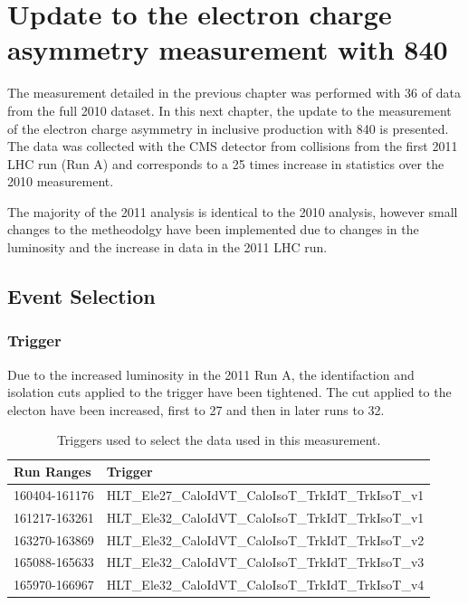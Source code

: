 \chapter[Electron Charge Asymmetry]{Update to the electron charge asymmetry
measurement with \unit{840}{\invpb} }

The measurement detailed in the previous chapter was performed with
\unit{36}{\invpb} of data from the full 2010 dataset. 
In this next chapter, the update to the measurement of the electron charge asymmetry in
inclusive \inclusiveWe production with \unit{840}{\invpb} is presented. 
The data was collected with the \ac{CMS} detector from collisions from the
first 2011 \ac{LHC} run (Run A) and corresponds to a 25 times increase in
statistics over the 2010 measurement.


The majority of the 2011 analysis is identical to the 2010 analysis,
however small changes to the metheodolgy have been implemented due to changes
in the luminosity and the increase in data in the 2011 \ac{LHC} run.

\section{Event Selection}

\subsection{Trigger}
Due to the increased luminosity in the 2011 Run A, the identifaction and
isolation cuts applied to the trigger have been tightened. The \PT cut applied
to the electon have been increased, first to \unit{27}{\GeV} and then in later
runs to \unit{32}{\GeV}.

\begin{table}[htbp]
  \begin{center}
    \leavevmode
     \begin{tabular}{ll} 
      Run Ranges & Trigger  \\
     \hline
     160404-161176 & HLT\_Ele27\_CaloIdVT\_CaloIsoT\_TrkIdT\_TrkIsoT\_v1  \\
     161217-163261 & HLT\_Ele32\_CaloIdVT\_CaloIsoT\_TrkIdT\_TrkIsoT\_v1  \\
     163270-163869 & HLT\_Ele32\_CaloIdVT\_CaloIsoT\_TrkIdT\_TrkIsoT\_v2  \\
     165088-165633 & HLT\_Ele32\_CaloIdVT\_CaloIsoT\_TrkIdT\_TrkIsoT\_v3  \\
     165970-166967 & HLT\_Ele32\_CaloIdVT\_CaloIsoT\_TrkIdT\_TrkIsoT\_v4  \\
     \end{tabular}

  \caption{Triggers used to select the data used in this measurement.}
  \label{asym840:triggers}

   \end{center}
\end{table}
